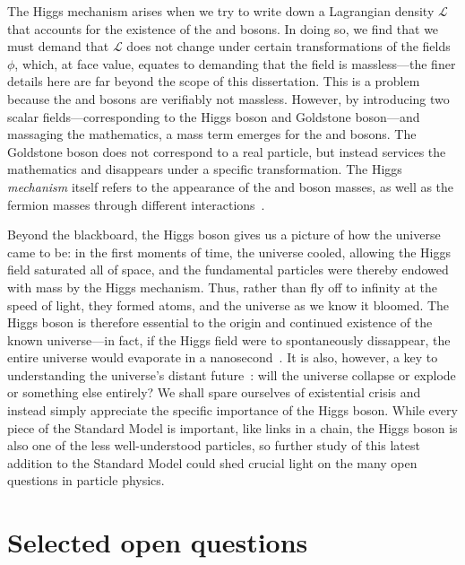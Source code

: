 The Higgs mechanism arises when we try to write down a Lagrangian density $\mathcal{L}$ that accounts for the existence of the \PW and \PZ bosons. 
In doing so, we find that we must demand that $\mathcal{L}$ does not change under certain transformations of the fields $\phi$, which, at face value, equates to demanding that the field is massless---the finer details here are far beyond the scope of this dissertation. 
This is a problem because the \PW and \PZ bosons are verifiably not massless. 
However, by introducing two scalar fields---corresponding to the Higgs boson and Goldstone boson---and massaging the mathematics, a mass term emerges for the \PW and \PZ bosons. 
The Goldstone boson does not correspond to a real particle, but instead services the mathematics\footnotemark{} and disappears under a specific transformation. 
The Higgs \textit{mechanism} itself refers to the appearance of the \PW and \PZ boson masses, as well as the fermion masses through different interactions~\cite{Weinberg:1967tq, Nambu:1961fr}. 

Beyond the blackboard, the Higgs boson gives us a picture of how the universe came to be: in the first moments of time, the universe cooled, allowing the Higgs field saturated all of space, and the fundamental particles were thereby endowed with mass by the Higgs mechanism. 
Thus, rather than fly off to infinity at the speed of light, they formed atoms, and the universe as we know it bloomed.  
The Higgs boson is therefore essential to the origin and continued existence of the known universe---in fact, if the Higgs field were to spontaneously dissappear, the entire universe would evaporate in a nanosecond~\cite{P5Report}. 
It is also, however, a key to understanding the universe's distant future~\cite{Bass2021}: will the universe collapse or explode or something else entirely? 
We shall spare ourselves of existential crisis and instead simply appreciate the specific importance of the Higgs boson. 
While every piece of the Standard Model is important, like links in a chain, the Higgs boson is also one of the less well-understood particles, so further study of this latest addition to the Standard Model could shed crucial light on the many open questions in particle physics. 

\section{Selected open questions}\label{sec:open_questions}
